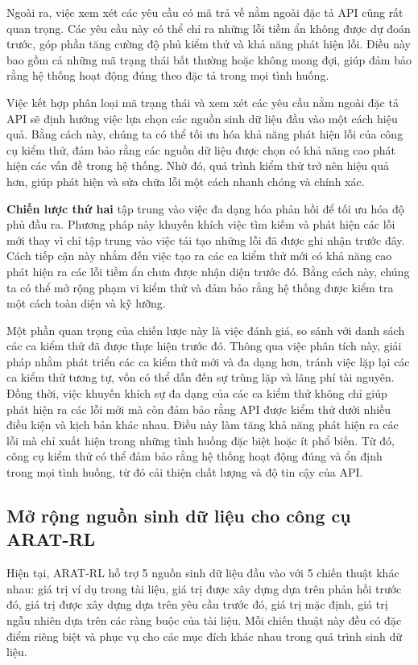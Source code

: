 Ngoài ra, việc xem xét các yêu cầu có mã trả về nằm ngoài đặc tả API cũng rất quan trọng. Các yêu cầu này có thể chỉ ra những lỗi tiềm ẩn không được dự đoán trước, góp phần tăng cường độ phủ kiểm thử và khả năng phát hiện lỗi. Điều này bao gồm cả những mã trạng thái bất thường hoặc không mong đợi, giúp đảm bảo rằng hệ thống hoạt động đúng theo đặc tả trong mọi tình huống.

Việc kết hợp phân loại mã trạng thái và xem xét các yêu cầu nằm ngoài đặc tả API sẽ định hướng việc lựa chọn các nguồn sinh dữ liệu đầu vào một cách hiệu quả. Bằng cách này, chúng ta có thể tối ưu hóa khả năng phát hiện lỗi của công cụ kiểm thử, đảm bảo rằng các nguồn dữ liệu được chọn có khả năng cao phát hiện các vấn đề trong hệ thống. Nhờ đó, quá trình kiểm thử trở nên hiệu quả hơn, giúp phát hiện và sửa chữa lỗi một cách nhanh chóng và chính xác.



\textbf{Chiến lược thứ hai} tập trung vào việc đa dạng hóa phản hồi để tối ưu hóa độ phủ đầu ra. Phương pháp này khuyến khích việc tìm kiếm và phát hiện các lỗi mới thay vì chỉ tập trung vào việc tái tạo những lỗi đã được ghi nhận trước đây. Cách tiếp cận này nhắm đến việc tạo ra các ca kiểm thử mới có khả năng cao phát hiện ra các lỗi tiềm ẩn chưa được nhận diện trước đó. Bằng cách này, chúng ta có thể mở rộng phạm vi kiểm thử và đảm bảo rằng hệ thống được kiểm tra một cách toàn diện và kỹ lưỡng.

Một phần quan trọng của chiến lược này là việc đánh giá, so sánh với danh sách các ca kiểm thử đã được thực hiện trước đó. Thông qua việc phân tích này, giải pháp nhằm phát triển các ca kiểm thử mới và đa dạng hơn, tránh việc lặp lại các ca kiểm thử tương tự, vốn có thể dẫn đến sự trùng lặp và lãng phí tài nguyên. Đồng thời, việc khuyến khích sự đa dạng của các ca kiểm thử không chỉ giúp phát hiện ra các lỗi mới mà còn đảm bảo rằng API được kiểm thử dưới nhiều điều kiện và kịch bản khác nhau. Điều này làm tăng khả năng phát hiện ra các lỗi mà chỉ xuất hiện trong những tình huống đặc biệt hoặc ít phổ biến. Từ đó, công cụ kiểm thử có thể đảm bảo rằng hệ thống hoạt động đúng và ổn định trong mọi tình huống, từ đó cải thiện chất lượng và độ tin cậy của API.






\subsection{Mở rộng nguồn sinh dữ liệu cho công cụ ARAT-RL}
Hiện tại, ARAT-RL hỗ trợ 5 nguồn sinh dữ liệu đầu vào với 5 chiến thuật khác nhau: giá trị ví dụ trong tài liệu, giá trị được xây dựng dựa trên phản hồi trước đó, giá trị được xây dựng dựa trên yêu cầu trước đó, giá trị mặc định, giá trị ngẫu nhiên dựa trên các ràng buộc của tài liệu. Mỗi chiến thuật này đều có đặc điểm riêng biệt và phục vụ cho các mục đích khác nhau trong quá trình sinh dữ liệu.

